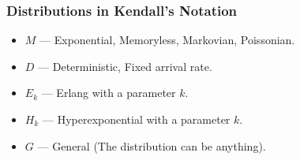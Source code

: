 \subsubsection{Distributions in Kendall's Notation}\label{subsubsec:Distros_Kendalls_Notation}
\begin{itemize}[noitemsep]
\item $M$ --- Exponential, Memoryless, Markovian, Poissonian.
\item $D$ --- Deterministic, Fixed arrival rate.
\item $E_{k}$ --- Erlang with a parameter $k$.
\item $H_{k}$ --- Hyperexponential with a parameter $k$.
\item $G$ --- General (The distribution can be anything).
\end{itemize}

